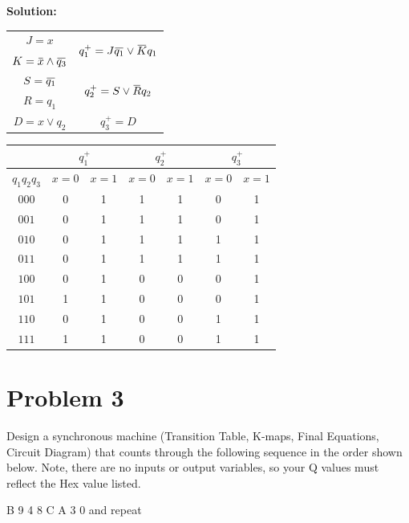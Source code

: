 \documentclass{article}
\newcommand{\overbar}[1]{\mkern 1.5mu\overline{\mkern-1.5mu#1\mkern-1.5mu}\mkern 1.5mu}
\begin{document}
    \textbf{Solution:}

    \begin{center}
        \begin{tabular} {|c|c|}
           \hline 
           $J=x$ & \multirow{2}{8em}{$q_1^+=J\overbar{q_1}\lor\overbar{K}q_1$} \\
           $K=\overbar{x}\land \overbar{q_3}$ & \\
           \hline
           $S=\overbar{q_1}$ & \multirow{2}{8em}{$q_2^+=S\lor\overbar{R}q_2$} \\
           $R=q_1$ & \\
           \hline
           $D=x\lor q_2$ & $q_3^+=D$ \\
           \hline
        \end{tabular}
    \end{center}

    \begin{center}
        \begin{tabular} {|c|c|c|c|c|c|c|}
            \hline
            &\multicolumn{2}{c|}{$q_1^+$}&\multicolumn{2}{c|}{$q_2^+$}&\multicolumn{2}{c|}{$q_3^+$} \\
            \hline
            $q_1q_2q_3$ & $x=0$ & $x=1$ & $x=0$ & $x=1$& $x=0$ & $x=1$ \\
            \hline
            $000$ &0&1&1&1&0&1 \\
            $001$ &0&1&1&1&0&1 \\
            $010$ &0&1&1&1&1&1 \\
            $011$ &0&1&1&1&1&1 \\
            $100$ &0&1&0&0&0&1 \\
            $101$ &1&1&0&0&0&1 \\
            $110$ &0&1&0&0&1&1 \\
            $111$ &1&1&0&0&1&1 \\
            \hline
        \end{tabular}
    \end{center}
    

    \section*{Problem 3}

    Design a synchronous machine (Transition Table, K-maps, Final Equations, Circuit 
    Diagram) that counts through the following sequence in the order shown 
    below. Note, there are no inputs or output variables, so your Q values must 
    reflect the Hex value listed.
    \begin{center}
        B 9 4 8 C A 3 0 and repeat
    \end{center}
\end{document}
